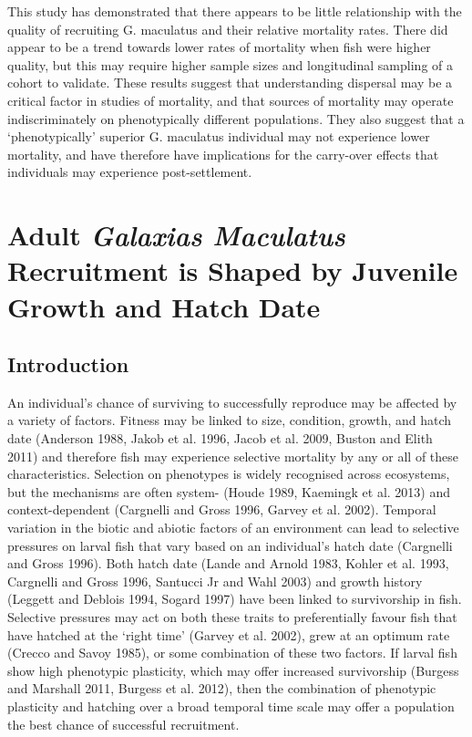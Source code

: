 \documentclass[]{book}
\begin{document}
This study has demonstrated that there appears to be little relationship
with the quality of recruiting G. maculatus and their relative mortality
rates. There did appear to be a trend towards lower rates of mortality
when fish were higher quality, but this may require higher sample sizes
and longitudinal sampling of a cohort to validate. These results suggest
that understanding dispersal may be a critical factor in studies of
mortality, and that sources of mortality may operate indiscriminately on
phenotypically different populations. They also suggest that a
`phenotypically' superior G. maculatus individual may not experience
lower mortality, and have therefore have implications for the carry-over
effects that individuals may experience post-settlement.

\chapter{\texorpdfstring{Adult \emph{Galaxias Maculatus} Recruitment is
Shaped by Juvenile Growth and Hatch
Date}{Adult Galaxias Maculatus Recruitment is Shaped by Juvenile Growth and Hatch Date}}\label{adult-galaxias-maculatus-recruitment-is-shaped-by-juvenile-growth-and-hatch-date}

\section{Introduction}\label{introduction-3}

An individual's chance of surviving to successfully reproduce may be
affected by a variety of factors. Fitness may be linked to size,
condition, growth, and hatch date (Anderson 1988, Jakob et al. 1996,
Jacob et al. 2009, Buston and Elith 2011) and therefore fish may
experience selective mortality by any or all of these characteristics.
Selection on phenotypes is widely recognised across ecosystems, but the
mechanisms are often system- (Houde 1989, Kaemingk et al. 2013) and
context-dependent (Cargnelli and Gross 1996, Garvey et al. 2002).
Temporal variation in the biotic and abiotic factors of an environment
can lead to selective pressures on larval fish that vary based on an
individual's hatch date (Cargnelli and Gross 1996). Both hatch date
(Lande and Arnold 1983, Kohler et al. 1993, Cargnelli and Gross 1996,
Santucci Jr and Wahl 2003) and growth history (Leggett and Deblois 1994,
Sogard 1997) have been linked to survivorship in fish. Selective
pressures may act on both these traits to preferentially favour fish
that have hatched at the `right time' (Garvey et al. 2002), grew at an
optimum rate (Crecco and Savoy 1985), or some combination of these two
factors. If larval fish show high phenotypic plasticity, which may offer
increased survivorship (Burgess and Marshall 2011, Burgess et al. 2012),
then the combination of phenotypic plasticity and hatching over a broad
temporal time scale may offer a population the best chance of successful
recruitment.
\end{document}
